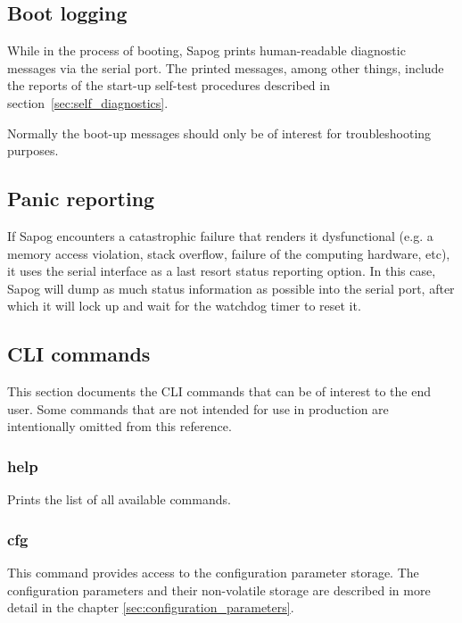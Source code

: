 \documentclass{zubaxdoc}
\begin{document}
	\subsection{Boot logging}
	
	While in the process of booting, Sapog prints human-readable diagnostic messages via the serial port.
	The printed messages, among other things, include the reports of the start-up self-test procedures
	described in section~\ref{sec:self_diagnostics}.
	
	Normally the boot-up messages should only be of interest for troubleshooting purposes.
	
	\subsection{Panic reporting}
	
	If Sapog encounters a catastrophic failure that renders it dysfunctional
	(e.g. a memory access violation, stack overflow, failure of the computing hardware, etc),
	it uses the serial interface as a last resort status reporting option.
	In this case, Sapog will dump as much status information as possible into the serial port,
	after which it will lock up and wait for the watchdog timer to reset it.
	
	\subsection{CLI commands}
	
	This section documents the CLI commands that can be of interest to the end user.
	Some commands that are not intended for use in production are intentionally omitted from this reference.
	
	\subsubsection{help}
	
	Prints the list of all available commands.
	
	\subsubsection{cfg}
	
	This command provides access to the configuration parameter storage.
	The configuration parameters and their non-volatile storage are described in more detail in the chapter
	\ref{sec:configuration_parameters}.
	
\end{document}
